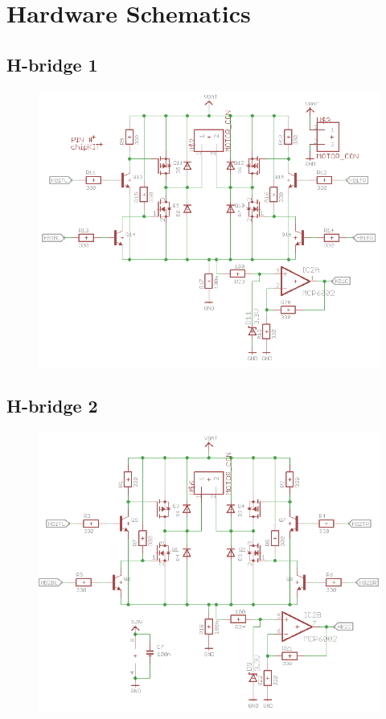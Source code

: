 \section{Hardware Schematics}

\subsection{H-bridge 1}
\begin{figure}[!ht]
	\centering
	\includegraphics[width=1\textwidth]{figures/HB1.PNG}
	\caption{}
	\label{HB1}
\end{figure}
\newpage
\subsection{H-bridge 2}
\begin{figure}[!ht]
	\centering
	\includegraphics[width=1\textwidth]{figures/HB2.PNG}
	\caption{}
	\label{HB2}
\end{figure}
\newpage
